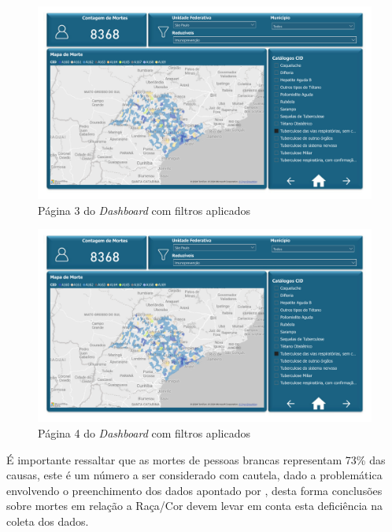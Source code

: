 \begin{figure}[H]
	\caption{\label{fig_dash_3}Página 3 do \textit{Dashboard} com filtros aplicados}
	\begin{center}
		\includegraphics[width=\textwidth, page = 3]{USPSC-img/dash}
	\end{center}
\end{figure}

\begin{figure}[H]
	\caption{\label{fig_dash_4}Página 4 do \textit{Dashboard} com filtros aplicados}
	\begin{center}
		\includegraphics[width=\textwidth, page = 4]{USPSC-img/dash}
	\end{center}
\end{figure}

É importante ressaltar que as mortes de pessoas brancas representam 73\% das causas, este é um número a ser considerado com cautela, dado a problemática envolvendo o preenchimento dos dados apontado por , desta forma conclusões sobre mortes em relação a Raça/Cor devem levar em conta esta deficiência na coleta dos dados.


